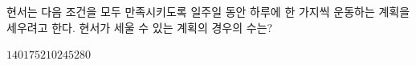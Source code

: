 \hspace*{2mm}\begin{minipage}[t]{\dimexpr\linewidth-2mm\relax}\vspace{0pt}
현서는 다음 조건을 모두 만족시키도록 일주일 동안 하루에 한 가지씩 운동하는 계획을 세우려고 한다. 현서가 세울 수 있는 계획의 경우의 수는? 
\begin{choices32}{$140$}{$175$}{$210$}{$245$}{$280$}\end{choices32}\end{minipage}
